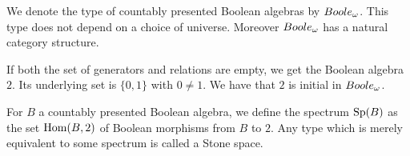 \begin{remark}
  We denote the type of countably presented Boolean algebras by $\Boole$. 
  This type does not depend on a choice of universe. 
  Moreover $\Boole$ has a natural category structure. 
\end{remark}

\begin{example}
  If both the set of generators and relations are empty, we get the Boolean algebra $2$.
  Its underlying set is $\{0,1\}$ with $0\neq 1$. We have that $2$ is initial in $\Boole$. 
\end{example}
%
\begin{definition}
  For $B$ a countably presented Boolean algebra, 
  we define the spectrum $\operatorname{Sp}(B)$ as the set $\mathrm{Hom}(B,2)$ of Boolean morphisms from $B$ to $2$.
  Any type which is merely equivalent to some spectrum is called a Stone space.
\end{definition}

